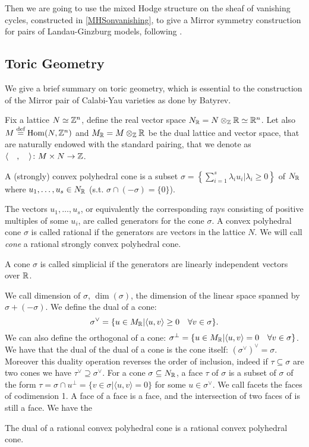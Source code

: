 \documentclass[../main.tex]{subfiles}
\begin{document}
Then we are going to use the mixed Hodge structure on the sheaf of vanishing cycles, constructed in \ref{MHSonvanishing}, to give a Mirror symmetry construction for pairs of Landau-Ginzburg models, following \cite{GKR17}.




\subsection{Toric Geometry}

We give a brief summary on toric geometry, which is essential to the construction of the Mirror pair of Calabi-Yau varieties as done by Batyrev.


Fix a lattice $N \simeq \mathbb{Z}^n$, define the real vector space $N_{\mathbb{R}} = N \otimes_{\mathbb{Z}} \mathbb{R} \simeq \mathbb{R}^n$. Let also $M \stackrel{\text{def}}{=} \operatorname{Hom}( N, \mathbb{Z}^n)$ and $M_{\mathbb{R}} = M \otimes_{\mathbb{Z}} \mathbb{R}$ be the dual lattice and vector space, that are naturally endowed with the standard pairing, that we
denote as $\langle \quad , \quad \rangle \colon M \times N \to \mathbb{Z}$.

\begin{defn}
A (strongly) convex polyhedral cone is a subset $\sigma = \left \{ \sum_{i=1}^s \lambda_i u_i | \lambda_i \geq 0 \right \} $ of $N_{\mathbb{R}}$ where $u_1, \dots , u_s \in N_{\mathbb{R}}$ (s.t. $\sigma \cap (-\sigma)= \{0\}$).
\end{defn} The vectors $u_1, \dots , u_s$, or equivalently the corresponding rays consisting of positive multiples of some $u_i$, are called generators for the cone $\sigma$. A convex polyhedral cone $\sigma$ is called rational if the generators are vectors in the lattice $N$. We will call \emph{cone} a rational strongly convex polyhedral cone. 
\begin{defn}
    A cone  $\sigma$ is called simplicial if the generators are linearly independent vectors over $\mathbb{R}$.
\end{defn} 
We call dimension of $\sigma$, $\dim(\sigma)$, the dimension of the linear space spanned by  $\sigma +  (-\sigma)$. We define the dual of a cone: 
\[
\sigma^\vee = \{ u \in M_{\mathbb{R}} | \langle u, v\rangle \geq 0 \quad \forall v \in \sigma \}.
\]
We can also define the orthogonal of a cone: $\sigma^\perp = \{ u \in M_{\mathbb{R}} | \langle u, v \rangle = 0 \quad \forall v \in \sigma \}$.
We have that the dual of the dual of a cone is the cone itself: $(\sigma^\vee)^\vee= \sigma$. Moreover this duality operation reverses the order of inclusion, indeed if $\tau \subseteq \sigma$ are two cones we have $\tau^\vee \supseteq \sigma^\vee$. For a cone $    \sigma \subseteq N_{\mathbb{R}}$, a face $\tau$ of $\sigma$ is a subset of $\sigma$ of the form $\tau = \sigma \cap u^\perp= \{ v \in \sigma | \langle u, v \rangle = 0 \}$ for some $u \in \sigma^\vee$. We call facets the faces of codimension 1. A face of a face is a face, and the intersection of two faces of is still a face. We have the
\begin{proposition} \textup{\cite[page 11]{Ful93}}
    The dual of a rational convex polyhedral cone is a rational convex polyhedral cone.
\end{proposition}
\end{document}
